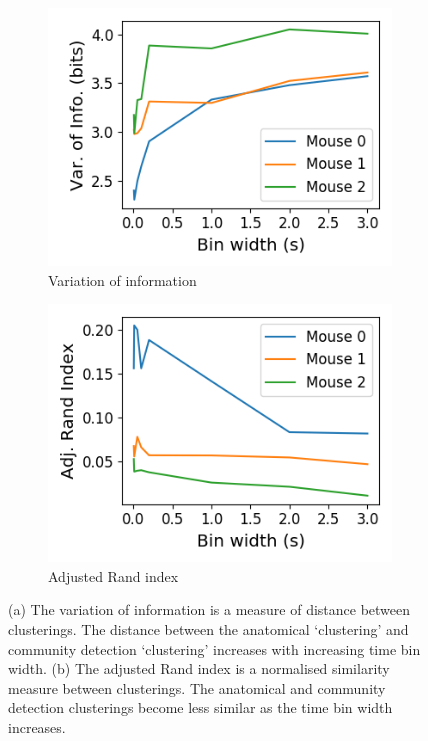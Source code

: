   \begin{figure}[h]
    \begin{subfigure}[h]{0.5\linewidth}
      \includegraphics[width=\linewidth]{figures/eight_probe/variation_of_information_rectified_total.png}
      \caption{Variation of information}
      \label{fig:variation_of_information_rectified_total}
    \end{subfigure}
    \begin{subfigure}[h]{0.5\linewidth}
      \includegraphics[width=\linewidth]{figures/eight_probe/adjusted_rand_index_rectified_total.png}
      \caption{Adjusted Rand index}
      \label{fig:adjusted_rand_index_rectified_total}
    \end{subfigure}
    \caption{(a) The variation of information is a measure of distance between clusterings. The distance between the anatomical `clustering' and community detection `clustering' increases with increasing time bin width. (b) The adjusted Rand index is a normalised similarity measure between clusterings. The anatomical and community detection clusterings become less similar as the time bin width increases. }
    \label{fig:distance_measures}
  \end{figure}

